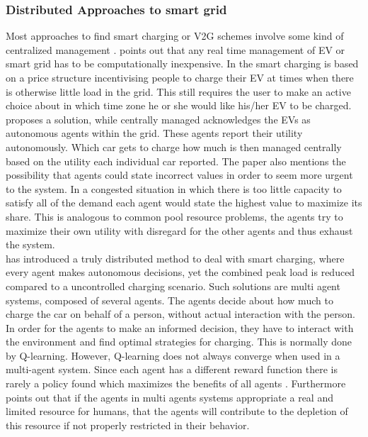 \documentclass[a4paper]{article}
\begin{document}
\subsubsection{Distributed Approaches to smart grid}
Most approaches to find smart charging or V2G schemes involve some kind of centralized management \cite{realtime}\cite{ACDC}\cite{eth}. \cite{realtime} points out that any real time
management of EV or smart grid has to be computationally inexpensive. In \cite{realtime} the smart charging is based on a price structure incentivising people to charge their EV at times 
when there is otherwise little load in the grid. This still requires the user to make an active choice about in which time zone he or she would like his/her EV to be charged. \\
\cite{eth} proposes a solution, while centrally managed acknowledges the EVs as autonomous agents within the grid. These agents report their utility autonomously. Which car gets to charge how much is then managed centrally based on the utility each individual car reported. The paper also 
mentions the possibility that agents could state incorrect values in order to seem more urgent to the system. In a congested situation in which there is too little capacity to satisfy
all of the demand each agent would state the highest value to maximize its share. This is analogous to common pool resource problems, the agents try to maximize their own utility with disregard for the other agents and thus exhaust the system.\\
\cite{reinforce_money} has introduced a truly distributed method to deal with smart charging, where every agent makes autonomous decisions, yet the combined peak load is reduced compared
to a uncontrolled charging scenario.
Such solutions are multi agent systems, composed of several agents. The agents decide about how much to charge the car on behalf of a person, without actual interaction with the person. In order for the agents to make an informed decision, they have to interact with the environment and find optimal strategies for charging. This is normally done by Q-learning. However, Q-learning does not always converge when used in a multi-agent system. 
Since each agent has a different reward function there is rarely a policy found which maximizes the benefits of all agents \cite{qfail}. Furthermore \cite{ai_cpr} points out that if the agents in multi agents systems appropriate a real and limited resource for humans, that the agents will contribute to the depletion of this resource if not properly restricted in their behavior. 
\end{document}
